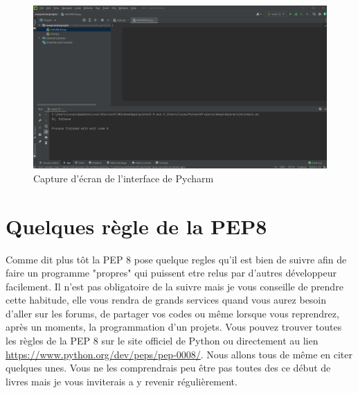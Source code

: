 \begin{figure}[H]
\includegraphics[scale=0.3]{Pycharm}
\caption{Capture d'écran de l'interface de Pycharm}
\end{figure}

\chapter{Quelques règle de la PEP8} \label{sec:PEP8}

Comme dit plus tôt la PEP 8 pose quelque regles qu'il est bien de suivre afin de faire un programme "propres" qui puissent etre relus par d'autres développeur facilement. Il n'est pas obligatoire de la suivre mais je vous conseille de prendre cette habitude, elle vous rendra de grands services quand vous aurez besoin d'aller sur les forums, de partager vos codes ou même lorsque vous reprendrez, après un moments, la programmation d'un projets. Vous pouvez trouver toutes les règles de la PEP 8 sur le site officiel de Python ou directement au lien \url{https://www.python.org/dev/peps/pep-0008/}. Nous allons tous de même en citer quelques unes. Vous ne les comprendrais peu être pas toutes des ce début de livres mais je vous inviterais a y revenir régulièrement.



